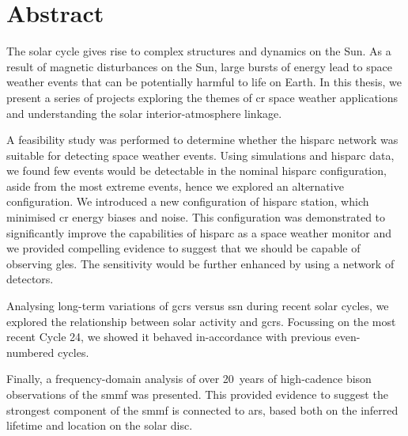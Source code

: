 \chapter*{Abstract}

The solar cycle gives rise to complex structures and dynamics on the Sun. As a result of magnetic disturbances on the Sun, large bursts of energy lead to space weather events that can be potentially harmful to life on Earth. In this thesis, we present a series of projects exploring the themes of \gls{cr} space weather applications and understanding the solar interior-atmosphere linkage. 

A feasibility study was performed to determine whether the \gls{hisparc} network was suitable for detecting space weather events. Using simulations and \gls{hisparc} data, we found few events would be detectable in the nominal \gls{hisparc} configuration, aside from the most extreme events, hence we explored an alternative configuration. We introduced a new configuration of \gls{hisparc} station, which minimised \gls{cr} energy biases and noise. This configuration was demonstrated to significantly improve the capabilities of \gls{hisparc} as a space weather monitor and we provided compelling evidence to suggest that we should be capable of observing \glspl{gle}. The sensitivity would be further enhanced by using a network of detectors.

Analysing long-term variations of \glspl{gcr} versus \gls{ssn} during recent solar cycles, we explored the relationship between solar activity and \glspl{gcr}. Focussing on the most recent Cycle 24, we showed it behaved in-accordance with previous even-numbered cycles.


Finally, a frequency-domain analysis of over 20~years of high-cadence \gls{bison} observations of the \gls{smmf} was presented. This provided evidence to suggest the strongest component of the \gls{smmf} is connected to \glspl{ar}, based both on the inferred lifetime and location on the solar disc.